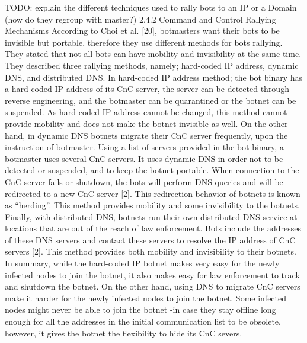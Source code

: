 TODO: explain the different techniques used to rally bots to an IP or a Domain (how do they regroup with master?)
2.4.2 Command and Control Rallying Mechanisms
According to Choi et al. [20], botmasters want their bots
to be invisible but portable, therefore they use different
methods for bots rallying. They stated that not all bots
can have mobility and invisibility at the same time. They
described three rallying methods, namely; hard-coded IP
address, dynamic DNS, and distributed DNS.
In hard-coded IP address method; the bot binary has a
hard-coded IP address of its CnC server, the server can be
detected through reverse engineering, and the botmaster
can be quarantined or the botnet can be suspended. As
hard-coded IP address cannot be changed, this method
cannot provide mobility and does not make the botnet
invisible as well. On the other hand, in dynamic DNS
botnets migrate their CnC server frequently, upon the
instruction of botmaster. Using a list of servers provided
in the bot binary, a botmaster uses several CnC servers.
It uses dynamic DNS in order not to be detected or suspended,
and to keep the botnet portable. When connection
to the CnC server fails or shutdown, the bots will
perform DNS queries and will be redirected to a new CnC
server [2]. This redirection behavior of botnets is known
as “herding”. This method provides mobility and some
invisibility to the botnets. Finally, with distributed DNS,
botnets run their own distributed DNS service at locations
that are out of the reach of law enforcement. Bots
include the addresses of these DNS servers and contact
these servers to resolve the IP address of CnC servers
[2]. This method provides both mobility and invisibility
to their botnets.
In summary, while the hard-coded IP botnet makes
very easy for the newly infected nodes to join the botnet,
it also makes easy for law enforcement to track and
shutdown the botnet. On the other hand, using DNS to
migrate CnC servers make it harder for the newly infected
nodes to join the botnet. Some infected nodes might never
be able to join the botnet -in case they stay offline long
enough for all the addresses in the initial communication
list to be obsolete, however, it gives the botnet the flexibility
to hide its CnC severs.

